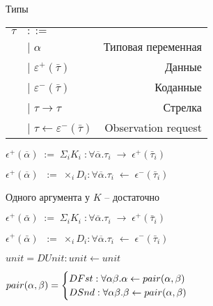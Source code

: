 \documentclass[10pt, mathserif]{beamer}
\let\\\tabularnewline
\let\\\tabularnewline
\theoremstyle{definition}
\begin{document}
\begin{frame}[c]{Типы}
\begin{tabular}{l l r}
  $\tau$ & $::=$ & \\
  &| $\alpha$ & Типовая переменная \\
  &| $\varepsilon^+(\bar{\tau})$  & Данные \\
  &| $\varepsilon^-(\bar{\tau})$  & Коданные \\
  &| $\tau \to \tau$ & Стрелка \\
  &| $\tau \leftarrow \varepsilon^-(\bar{\tau})$ & Observation request \\
\end{tabular}

\vspace{1cm}
\centering
$\epsilon^+(\overline{\alpha})\;:=\; \Sigma_i K_i \;:\forall\overline{\alpha}.\tau_i \;\to       \;\epsilon^+(\bar{\tau}_i)$

$\epsilon^+(\overline{\alpha})\;\;:=\; \times_i D_i   :\forall\overline{\alpha}.\tau_i \;\leftarrow\;\epsilon^-(\bar{\tau}_i)$
\end{frame}

\begin{frame}[c]{Одного аргумента у $K$ -- достаточно}

\centering
$\epsilon^+(\bar{\alpha})\;:=\; \Sigma_i K_i \;:\forall\overline{\alpha}.\tau_i \;\to       \;\epsilon^+(\bar{\tau}_i)$

$\epsilon^+(\bar{\alpha})\;\;:=\; \times_i D_i   :\forall\overline{\alpha}.\tau_i \;\leftarrow\;\epsilon^-(\bar{\tau}_i)$
\vspace{1cm}

$unit = DUnit : unit \leftarrow unit$
\vspace{.5cm}

$pair(\alpha,\beta) = \begin{cases}
    DFst : \forall\alpha \beta . \alpha \leftarrow pair(\alpha,\beta) \\
    DSnd : \forall\alpha \beta . \beta  \leftarrow pair(\alpha,\beta)
\end{cases}$
\end{frame}
\end{document}

